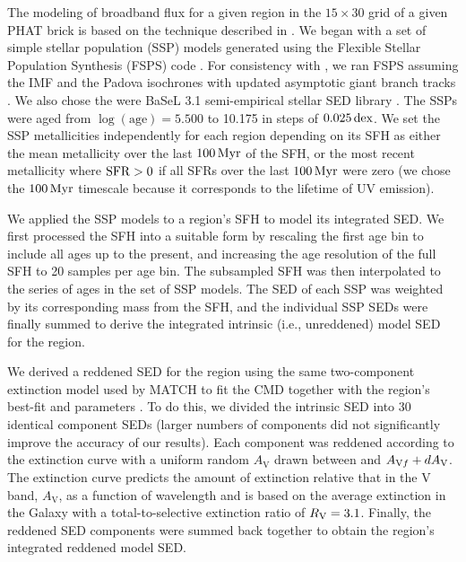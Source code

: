 The modeling of broadband flux for a given region in the $15 \times 30$ grid of
a given PHAT brick is based on the technique described in \citet{Johnson:2013}.
We began with a set of simple stellar population (SSP) models generated using
the Flexible Stellar Population Synthesis (FSPS) code \citep{Conroy:2009,
Conroy:2010}. For consistency with \citet{Lewis:2014}, we ran FSPS assuming the
\citet{Kroupa:2001} IMF and the Padova isochrones \citep{Marigo:2008} with
updated asymptotic giant branch tracks \citep{Girardi:2010}. We also chose the
were BaSeL 3.1 semi-empirical stellar SED library \citep{Westera:2002}. The
SSPs were aged from $\log(\mathrm{age})=5.500$ to 10.175 in steps of
$0.025\,\mathrm{dex}$. We set the SSP metallicities independently for each region
depending on its SFH as either the mean metallicity over the last $100\,\mathrm{Myr}$ of
the SFH, or the most recent metallicity where $\mathrm{SFR} > 0$ if all SFRs over the
last $100\,\mathrm{Myr}$ were zero (we chose the $100\,\mathrm{Myr}$ timescale because it
corresponds to the lifetime of UV emission).

We applied the SSP models to a region's SFH to model its integrated SED. We
first processed the SFH into a suitable form by rescaling the first age bin to
include all ages up to the present, and increasing the age resolution of the
full SFH to 20 samples per age bin. The subsampled SFH was then interpolated to
the series of ages in the set of SSP models. The SED of each SSP was weighted
by its corresponding mass from the SFH, and the individual SSP SEDs were
finally summed to derive the integrated intrinsic (i.e., unreddened) model SED
for the region.

We derived a reddened SED for the region using the same two-component
extinction model used by MATCH to fit the CMD together with the region's
best-fit \avf{} and \dav{} parameters \citep{Lewis:2014}. To do this, we
divided the intrinsic SED into 30 identical component SEDs (larger numbers of
components did not significantly improve the accuracy of our results). Each
component was reddened according to the \citet{Cardelli:1989} extinction curve
with a uniform random $A_\mathrm{V}$ drawn between \avf{} and $A_{\mathrm{V}f} + dA_\mathrm{V}$.
The \citet{Cardelli:1989} extinction curve predicts the amount of extinction
relative that in the V band, $A_\mathrm{V}$, as a function of wavelength and is
based on the average extinction in the Galaxy with a total-to-selective
extinction ratio of $R_\mathrm{V} = 3.1$. Finally, the reddened SED components were
summed back together to obtain the region's integrated reddened model SED.

